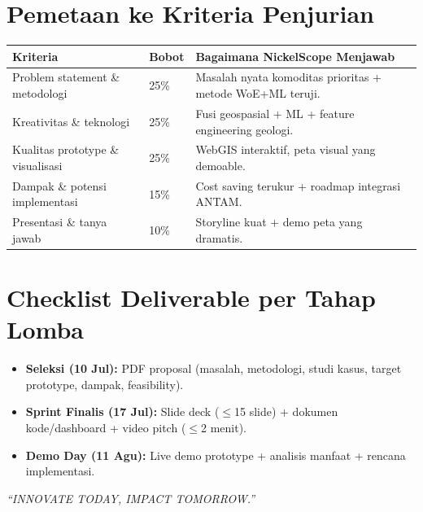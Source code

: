 \documentclass[11pt,a4paper]{article}
\newcommand{\todo}{\item[$\square$]}
\begin{document}
\section{Pemetaan ke Kriteria Penjurian}
\label{sec:scoring}

\renewcommand{\arraystretch}{1.3}
\begin{longtable}{p{5.2cm} p{1.5cm} p{7.8cm}}
\toprule
\rowcolor{softgray}
\textbf{Kriteria} & \textbf{Bobot} & \textbf{Bagaimana NickelScope Menjawab} \\
\midrule
\endhead
Problem statement \& metodologi & 25\% & Masalah nyata komoditas prioritas + metode WoE+ML teruji. \\
Kreativitas \& teknologi & 25\% & Fusi geospasial + ML + feature engineering geologi. \\
Kualitas prototype \& visualisasi & 25\% & WebGIS interaktif, peta visual yang demoable. \\
Dampak \& potensi implementasi & 15\% & Cost saving terukur + roadmap integrasi ANTAM. \\
Presentasi \& tanya jawab & 10\% & Storyline kuat + demo peta yang dramatis. \\
\bottomrule
\end{longtable}

\section{Checklist Deliverable per Tahap Lomba}
\label{sec:deliverables}

\begin{itemize}[leftmargin=1.5em]
  \todo \textbf{Seleksi (10 Jul):} PDF proposal (masalah, metodologi, studi kasus, target prototype, dampak, feasibility).
  \todo \textbf{Sprint Finalis (17 Jul):} Slide deck ($\leq$15 slide) + dokumen kode/dashboard + video pitch ($\leq$2 menit).
  \todo \textbf{Demo Day (11 Agu):} Live demo prototype + analisis manfaat + rencana implementasi.
\end{itemize}

\vspace{1em}
\begin{center}\itshape
``INNOVATE TODAY, IMPACT TOMORROW.''
\end{center}
\end{document}
